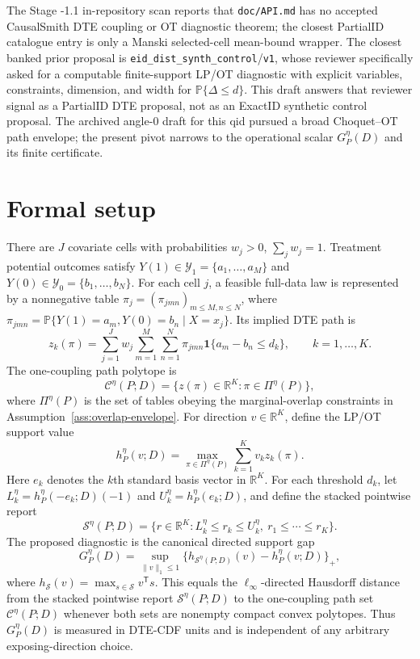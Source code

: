 \documentclass[11pt]{article}
\renewcommand{\Pr}{\mathbb{P}}
\newcommand{\one}{\mathbf{1}}
\newcommand{\transpose}{\mathsf{T}}
\theoremstyle{definition}
\theoremstyle{plain}
\theoremstyle{remark}
\begin{document}
The Stage -1.1 in-repository scan reports that \texttt{doc/API.md} has no
accepted CausalSmith DTE coupling or OT diagnostic theorem; the closest PartialID
catalogue entry is only a Manski selected-cell mean-bound wrapper.  The closest
banked prior proposal is
\texttt{eid\_dist\_synth\_control}/\texttt{v1}, whose reviewer specifically asked
for a computable finite-support LP/OT diagnostic with explicit variables,
constraints, dimension, and width for \(\Pr\{\Delta\le d\}\).  This draft answers
that reviewer signal as a PartialID DTE proposal, not as an ExactID synthetic
control proposal.  The archived angle-0 draft for this qid pursued a broad
Choquet--OT path envelope; the present pivot narrows to the operational scalar
\(G^\eta_P(D)\) and its finite certificate.

\section{Formal setup}
\label{sec:setup}
There are \(J\) covariate cells with probabilities \(w_j>0\), \(\sum_j w_j=1\).
Treatment potential outcomes satisfy \(Y(1)\in\mathcal Y_1=\{a_1,\ldots,a_M\}\)
and \(Y(0)\in\mathcal Y_0=\{b_1,\ldots,b_N\}\).  For each cell \(j\), a feasible
full-data law is represented by a nonnegative table
\(\pi_j=(\pi_{jmn})_{m\le M,n\le N}\), where
\(\pi_{jmn}=\Pr\{Y(1)=a_m,Y(0)=b_n\mid X=x_j\}\).  Its implied DTE path is
\[
z_k(\pi)=\sum_{j=1}^J w_j\sum_{m=1}^M\sum_{n=1}^N
\pi_{jmn}\one\{a_m-b_n\le d_k\},\qquad k=1,\ldots,K.
\]
The one-coupling path polytope is
\[
\mathcal C^\eta(P;D)=\{z(\pi)\in\mathbb R^K:\pi\in\Pi^\eta(P)\},
\]
where \(\Pi^\eta(P)\) is the set of tables obeying the marginal-overlap
constraints in Assumption~\ref{ass:overlap-envelope}.  For direction
\(v\in\mathbb R^K\), define the LP/OT support value
\[
h^\eta_P(v;D)=
\max_{\pi\in\Pi^\eta(P)}
\sum_{k=1}^K v_k z_k(\pi).
\]
Here \(e_k\) denotes the \(k\)th standard basis vector in \(\mathbb R^K\).
For each threshold \(d_k\), let \(L^\eta_k=h^\eta_P(-e_k;D)(-1)\) and
\(U^\eta_k=h^\eta_P(e_k;D)\), and define the stacked pointwise report
\[
\mathcal S^\eta(P;D)=
\{r\in\mathbb R^K:L^\eta_k\le r_k\le U^\eta_k,\ r_1\le\cdots\le r_K\}.
\]
The proposed diagnostic is the canonical directed support gap
\[
G^\eta_P(D)=
\sup_{\|v\|_1\le 1}
\{h_{\mathcal S^\eta(P;D)}(v)-h^\eta_P(v;D)\}_+,
\]
where \(h_{\mathcal S}(v)=\max_{s\in\mathcal S}v^\transpose s\).  This equals
the \(\ell_\infty\)-directed Hausdorff distance from the stacked pointwise report
\(\mathcal S^\eta(P;D)\) to the one-coupling path set
\(\mathcal C^\eta(P;D)\) whenever both sets are nonempty compact convex
polytopes.  Thus \(G^\eta_P(D)\) is measured in DTE-CDF units and is independent
of any arbitrary exposing-direction choice.
\end{document}
